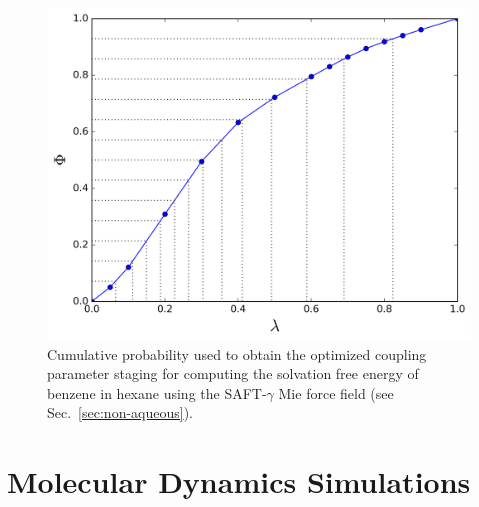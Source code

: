 \documentclass[final,12p,times,twocolumn]{elsarticle}
\begin{document}
	\begin{figure}[h]
		\centering
		\includegraphics[width=0.9\columnwidth]{Figures/optimized_cdf}
		\caption{Cumulative probability used to obtain the optimized coupling parameter staging for computing the solvation free energy of benzene in hexane using the SAFT-$\gamma$ Mie force field (see Sec.~\ref{sec:non-aqueous}).}
		\label{fig:optimized_cdf}
	\end{figure}
	
	\section{Molecular Dynamics Simulations}\label{mds}
\end{document}
